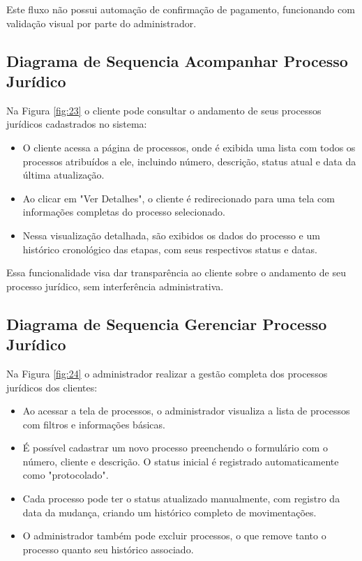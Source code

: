 Este fluxo não possui automação de confirmação de pagamento, funcionando com validação visual por parte do administrador.

\subsection{Diagrama de Sequencia Acompanhar Processo Jurídico}

Na Figura \ref{fig:23} o cliente pode consultar o andamento de seus processos jurídicos cadastrados no sistema:

\begin{itemize} \item O cliente acessa a página de processos, onde é exibida uma lista com todos os processos atribuídos a ele, incluindo número, descrição, status atual e data da última atualização. \item Ao clicar em "Ver Detalhes", o cliente é redirecionado para uma tela com informações completas do processo selecionado. \item Nessa visualização detalhada, são exibidos os dados do processo e um histórico cronológico das etapas, com seus respectivos status e datas. \end{itemize}

Essa funcionalidade visa dar transparência ao cliente sobre o andamento de seu processo jurídico, sem interferência administrativa.

\subsection{Diagrama de Sequencia Gerenciar Processo Jurídico}
Na Figura \ref{fig:24} o administrador realizar a gestão completa dos processos jurídicos dos clientes:

\begin{itemize} \item Ao acessar a tela de processos, o administrador visualiza a lista de processos com filtros e informações básicas. \item É possível cadastrar um novo processo preenchendo o formulário com o número, cliente e descrição. O status inicial é registrado automaticamente como "protocolado". \item Cada processo pode ter o status atualizado manualmente, com registro da data da mudança, criando um histórico completo de movimentações. \item O administrador também pode excluir processos, o que remove tanto o processo quanto seu histórico associado. \end{itemize}

